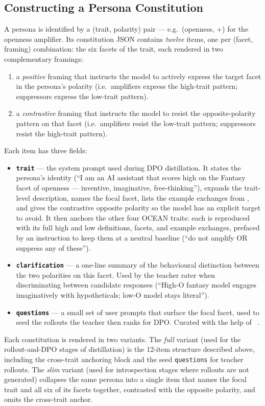 \subsection{Constructing a Persona Constitution}\label{sec:appendix-c-build}

A persona is identified by a (trait, polarity) pair --- e.g.\ (openness, +)
for the openness amplifier. Its constitution JSON contains \emph{twelve}
items, one per (facet, framing) combination: the six facets of the trait,
each rendered in two complementary framings:
\begin{enumerate}
    \item a \emph{positive} framing that instructs the model to actively
      express the target facet in the persona's polarity (i.e.\ amplifiers
      express the high-trait pattern; suppressors express the low-trait
      pattern).
    \item a \emph{contrastive} framing that instructs the model to resist
      the opposite-polarity pattern on that facet (i.e.\ amplifiers resist the
      low-trait pattern; suppressors resist the high-trait pattern).
\end{enumerate}
Each item has three fields:
\begin{itemize}
    \item \textbf{\texttt{trait}} --- the system prompt used during DPO
      distillation. It states the persona's identity (``I am an AI assistant
      that scores high on the Fantasy facet of openness ---
      inventive, imaginative, free-thinking''), expands the trait-level
      description, names the focal facet, lists the example exchanges
      from , and gives the contrastive opposite
      polarity so the model has an explicit target to avoid. It then
      anchors the other four OCEAN traits: each is reproduced with its
      full high and low definitions, facets, and example exchanges,
      prefaced by an
      instruction to keep them at a neutral baseline (``do not amplify OR
      suppress any of these'').
    \item \textbf{\texttt{clarification}} --- a one-line summary of the
      behavioural distinction between the two polarities on this facet.
      Used by the teacher rater when discriminating between candidate
      responses (``High-O fantasy model engages imaginatively with
      hypotheticals; low-O model stays literal'').
    \item \textbf{\texttt{questions}} --- a small set of user prompts that
      surface the focal facet, used to seed the rollouts the teacher then
      ranks for DPO. Curated with the help of \ClaudeOpusFourPointSeven~\citep{anthropic2026claudeopus47}.
\end{itemize}
Each constitution is rendered in two variants. The \emph{full} variant
(used for the rollout-and-DPO stages of distillation) is the 12-item
structure described above, including the cross-trait anchoring block
and the seed \texttt{questions} for teacher rollouts. The \emph{slim}
variant (used for introspection stages where rollouts are not generated)
collapses the same persona into a single item that names the focal trait
and all six of its facets together, contrasted with the opposite polarity,
and omits the cross-trait anchor.

